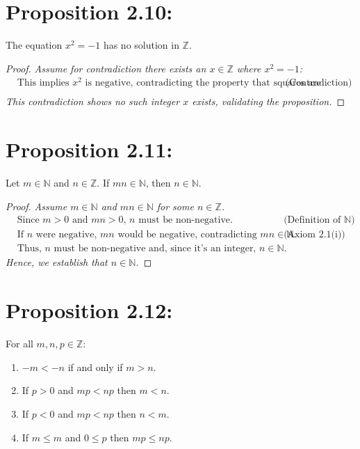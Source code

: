 \section*{Proposition 2.10:}
The equation $x^2 = -1$ has no solution in $\mathbb{Z}$.
\begin{proof}
    \textit{Assume for contradiction there exists an $x \in \mathbb{Z}$ where $x^2 = -1$:}
    \begin{align*}
        & \text{This implies $x^2$ is negative, contradicting the property that squares are non-negative.} & & \text{(Contradiction)} \\
    \end{align*}
    \textit{This contradiction shows no such integer $x$ exists, validating the proposition.}
\end{proof}



\section*{Proposition 2.11:}
Let $m \in \mathbb{N}$ and $n \in \mathbb{Z}$. If $mn \in \mathbb{N}$, then $n \in \mathbb{N}$.
\begin{proof}
    \textit{Assume $m \in \mathbb{N}$ and $mn \in \mathbb{N}$ for some $n \in \mathbb{Z}$.}
    \begin{align*}
        & \text{Since $m > 0$ and $mn > 0$, $n$ must be non-negative.} & & \text{(Definition of $\mathbb{N}$)} \\
        & \text{If $n$ were negative, $mn$ would be negative, contradicting $mn \in \mathbb{N}$.} & & \text{(Axiom 2.1(i))} \\
        & \text{Thus, $n$ must be non-negative and, since it's an integer, $n \in \mathbb{N}$.} & &
    \end{align*}
    \textit{Hence, we establish that $n \in \mathbb{N}$.}
\end{proof}



\section*{Proposition 2.12:}
For all $m,n,p \in \mathbb{Z}$:
\begin{enumerate}[label=(\roman*)]
    \item $-m < -n$ if and only if $m > n$.
    \item If $p > 0$ and $mp < np$ then $m < n$.
    \item If $p < 0$ and $mp < np$ then $n < m$.
    \item If $m \leq m$ and $0 \leq p$ then $mp \leq np$.
\end{enumerate}
